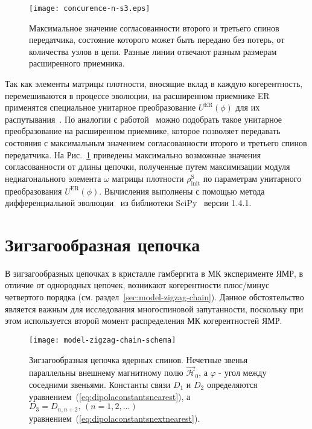 \begin{figure}[H]
    \centering
    \texttt{[image: concurence-n-s3.eps]}
    \caption{
      Максимальное значение согласованности второго и третьего спинов передатчика, состояние которого может быть передано без потерь,
      от количества узлов в цепи.
      Разные линии отвечают разным размерам расширенного приемника.
    }
    \label{fig:concurence-n-s3}
\end{figure}


Так как элементы матрицы плотности, вносящие вклад в каждую когерентность, перемешиваются в процессе эволюции,
на расширенном приемнике ER применятся специальное унитарное преобразование $U^\mathrm{ER}(\phi)$ для их распутывания~\cite{Feldman2017}.
По аналогии с работой~\cite{Bochkin2022} можно подобрать такое унитарное преобразование на расширенном приемнике,
которое позволяет передавать состояния с максимальным значением согласованности второго и третьего спинов передатчика.
На Рис.~\ref{fig:concurence-n-s3} приведены максимально возможные значения согласованности от длины цепочки,
полученные путем максимизации модуля недиагонального элемента $\omega$ матрицы плотности $\rho^\mathrm{S}_\mathrm{init}$ по параметрам унитарного преобразования $U^\mathrm{ER}(\phi)$.
Вычисления выполнены с помощью метода дифференциальной эволюции~\cite{Storn1997,Wormington1999,Lampinen2002} из библиотеки SciPy~\cite{SciPy} версии 1.4.1.


\section{Зигзагообразная цепочка}
В зигзагообразных цепочках в кристалле гамбергита в МК эксперименте ЯМР,
в отличие от однородных цепочек,
возникают когерентности плюс/минус четвертого порядка (см. раздел~\ref{sec:model-zigzag-chain}).
Данное обстоятельство является важным для исследования многоспиновой запутанности,
поскольку при этом используется второй момент распределения МК когерентностей ЯМР.

\begin{figure}[H]
    \centering
    \texttt{[image: model-zigzag-chain-schema]}
    \caption{
      Зигзагообразная цепочка ядерных спинов.
      Нечетные звенья параллельны внешнему магнитному полю $\vec{\mathcal H}_0$,
      а $\varphi$ - угол между соседними звеньями.
      Константы связи $D_1$ и $D_2$ определяются уравнением~(\ref{eq:dipolaconstantsnearest}), а $D_3=D_{n, n+2},\, (n=1,2,...)$
      уравнением~(\ref{eq:dipolaconstantsnextnearest}).
    }
    \label{fig:model-zigzag-chain-schema}
\end{figure}

